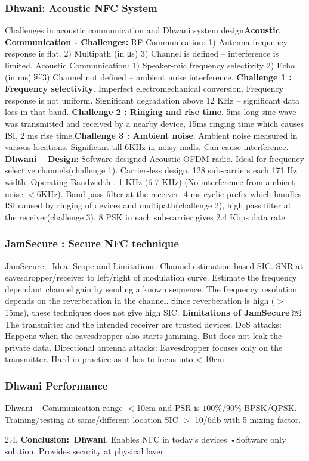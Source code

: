 \documentclass[9pt]{extarticle}
\begin{document}
\begin{multicols}{2}
\subsubsection{Dhwani: Acoustic NFC System}

Challenges in acoustic communication and Dhwani system design\textbf{Acoustic Communication - Challenges:} RF Communication: 1) Antenna frequency response is flat. 2) Multipath (in μs) 3) Channel is defined – interference is limited. Acoustic Communication: 1) Speaker-mic frequency selectivity 2) Echo (in ms) ￼3) Channel not defined – ambient noise interference. \textbf{Challenge 1 : Frequency selectivity}. Imperfect electromechanical conversion. Frequency response is not uniform. Significant degradation above 12 KHz – significant data loss in that band. \textbf{Challenge 2 : Ringing and rise time}. 5ms long sine wave was transmitted and received by a nearby device, 15ms ringing time which causes ISI, 2 ms rise time.\textbf{Challenge 3 : Ambient noise}. Ambient noise measured in various locations. Significant till 6KHz in noisy malls. Can cause interference. \textbf{Dhwani – Design}: Software designed Acoustic OFDM radio. Ideal for frequency selective channels(challenge 1). Carrier-less design. 128 sub-carriers each 171 Hz width. Operating Bandwidth : 1 KHz (6-7 KHz) (No interference from ambient noise $<$6KHz). Band pass filter at the receiver. 4 ms cyclic prefix which handles ISI caused by ringing of devices and multipath(challenge 2), high pass filter at the receiver(challenge 3), 8 PSK in each sub-carrier gives 2.4 Kbps data rate.

\subsubsection{JamSecure : Secure NFC technique}

JamSecure - Idea. Scope and Limitations: Channel estimation based SIC. SNR at eavesdropper/receiver to left/right of modulation curve. Estimate the frequency dependant channel gain by sending a known sequence. The frequency resolution depends on the reverberation in the channel. Since reverberation is high ($>$15ms), these techniques does not give high SIC. \textbf{Limitations of JamSecure} ￼The transmitter and the intended receiver are trusted devices.
DoS attacks: Happens when the eavesdropper also starts jamming. But does not leak the private data. Directional antenna attacks: Eavesdropper focuses only on the transmitter. Hard in practice as it has to focus into < 10cm.

\subsubsection{Dhwani Performance}Dhwani – Communication range $<$10cm and PSR is $100\%$/$90\%$ BPSK/QPSK. Training/testing at same/different location SIC $>$ 10/6db with 5 mixing factor.

2.4. \textbf{Conclusion:\ Dhwani}. Enables NFC in today’s devices •Software only solution. Provides security at physical layer.

\end{multicols}
\end{document}
